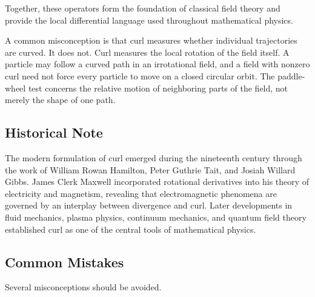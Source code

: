 Together, these operators form the foundation of classical field theory and
provide the local differential language used throughout mathematical physics.


A common misconception is that curl measures whether individual trajectories
are curved. It does not. Curl measures the local rotation of the field itself.
A particle may follow a curved path in an irrotational field, and a field with
nonzero curl need not force every particle to move on a closed circular orbit.
The paddle-wheel test concerns the relative motion of neighboring parts of the
field, not merely the shape of one path.

\subsection{Historical Note}

The modern formulation of curl emerged during the nineteenth century through
the work of William Rowan Hamilton, Peter Guthrie Tait, and Josiah Willard
Gibbs. James Clerk Maxwell incorporated rotational derivatives into his theory
of electricity and magnetism, revealing that electromagnetic phenomena are
governed by an interplay between divergence and curl. Later developments in
fluid mechanics, plasma physics, continuum mechanics, and quantum field theory
established curl as one of the central tools of mathematical physics.

\subsection{Common Mistakes}

Several misconceptions should be avoided.


